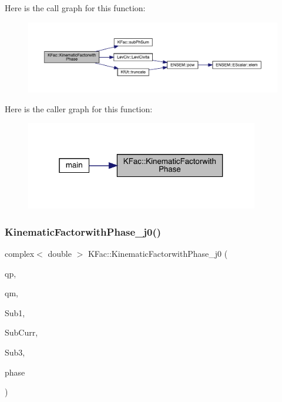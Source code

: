 Here is the call graph for this function\+:
\nopagebreak
\begin{figure}[H]
\begin{center}
\leavevmode
\includegraphics[width=350pt]{d2/d89/namespaceKFac_ac10b1bd8db1661c292e327a3eabcebb9_cgraph}
\end{center}
\end{figure}
Here is the caller graph for this function\+:
\nopagebreak
\begin{figure}[H]
\begin{center}
\leavevmode
\includegraphics[width=289pt]{d2/d89/namespaceKFac_ac10b1bd8db1661c292e327a3eabcebb9_icgraph}
\end{center}
\end{figure}
\mbox{\label{namespaceKFac_a8a20f176fbf91758f8699734b8df3f04}} 
\subsubsection{\texorpdfstring{KinematicFactorwithPhase\_j0()}{KinematicFactorwithPhase\_j0()}\hspace{0.1cm}{\footnotesize\ttfamily [1/2]}}
{\footnotesize\ttfamily complex$<$ double $>$ K\+Fac\+::\+Kinematic\+Factorwith\+Phase\+\_\+j0 (\begin{DoxyParamCaption}\item[{Eigen\+::\+Vector\+Xd \&}]{qp,  }\item[{Eigen\+::\+Vector\+Xd \&}]{qm,  }\item[{map$<$ int, Eigen\+::\+Matrix\+Xcd $>$ \&}]{Sub1,  }\item[{Eigen\+::\+Matrix\+Xcd \&}]{Sub\+Curr,  }\item[{map$<$ int, Eigen\+::\+Matrix\+Xcd $>$ \&}]{Sub3,  }\item[{\mbox{\hyperlink{structPh_1_1phChars}{Ph\+::ph\+Chars}} \&}]{phase }\end{DoxyParamCaption})}

